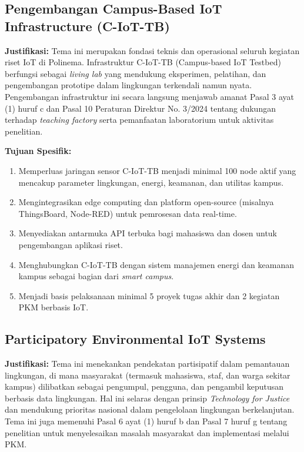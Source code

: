 \documentclass[12pt,a4paper]{article}
\begin{document}
\subsection{Pengembangan Campus-Based IoT Infrastructure (C-IoT-TB)}

\textbf{Justifikasi:}
Tema ini merupakan fondasi teknis dan operasional seluruh kegiatan riset IoT di Polinema. Infrastruktur C-IoT-TB (Campus-based IoT Testbed) berfungsi sebagai \textit{living lab} yang mendukung eksperimen, pelatihan, dan pengembangan prototipe dalam lingkungan terkendali namun nyata. Pengembangan infrastruktur ini secara langsung menjawab amanat Pasal 3 ayat (1) huruf c dan Pasal 10 Peraturan Direktur No. 3/2024 tentang dukungan terhadap \textit{teaching factory} serta pemanfaatan laboratorium untuk aktivitas penelitian.

\textbf{Tujuan Spesifik:}
\begin{enumerate}[leftmargin=*]
    \item Memperluas jaringan sensor C-IoT-TB menjadi minimal 100 node aktif yang mencakup parameter lingkungan, energi, keamanan, dan utilitas kampus.
    \item Mengintegrasikan edge computing dan platform open-source (misalnya ThingsBoard, Node-RED) untuk pemrosesan data real-time.
    \item Menyediakan antarmuka API terbuka bagi mahasiswa dan dosen untuk pengembangan aplikasi riset.
    \item Menghubungkan C-IoT-TB dengan sistem manajemen energi dan keamanan kampus sebagai bagian dari \textit{smart campus}.
    \item Menjadi basis pelaksanaan minimal 5 proyek tugas akhir dan 2 kegiatan PKM berbasis IoT.
\end{enumerate}

\subsection{Participatory Environmental IoT Systems}

\textbf{Justifikasi:}
Tema ini menekankan pendekatan partisipatif dalam pemantauan lingkungan, di mana masyarakat (termasuk mahasiswa, staf, dan warga sekitar kampus) dilibatkan sebagai pengumpul, pengguna, dan pengambil keputusan berbasis data lingkungan. Hal ini selaras dengan prinsip \textit{Technology for Justice} dan mendukung prioritas nasional dalam pengelolaan lingkungan berkelanjutan. Tema ini juga memenuhi Pasal 6 ayat (1) huruf b dan Pasal 7 huruf g tentang penelitian untuk menyelesaikan masalah masyarakat dan implementasi melalui PKM.
\end{document}
